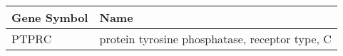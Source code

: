 \begin{tabular}{ll}
\toprule
Gene Symbol &                                           Name \\
\midrule
      PTPRC & protein tyrosine phosphatase, receptor type, C \\
\bottomrule
\end{tabular}
